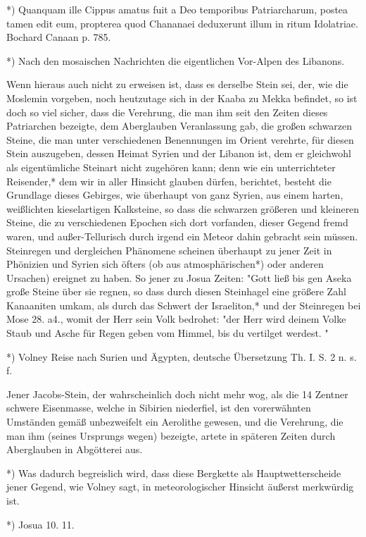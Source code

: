 \documentclass[a4paper, 11pt, oneside, polutonikogreek, german]{article}
\begin{document}
*) Quanquam ille Cippus amatus fuit a Deo temporibus Patriarcharum, postea tamen edit eum, propterea quod Chananaei deduxerunt illum in ritum Idolatriae. Bochard Canaan p. 785.

*) Nach den mosaischen Nachrichten die eigentlichen Vor-Alpen des Libanons.

Wenn hieraus auch nicht zu erweisen ist, dass es derselbe Stein sei, der, wie die Moslemin vorgeben, noch heutzutage sich in der Kaaba zu Mekka befindet, so ist doch so viel sicher, dass die Verehrung, die man ihm seit den Zeiten dieses Patriarchen bezeigte, dem Aberglauben Veranlassung gab, die großen schwarzen Steine, die man unter verschiedenen Benennungen im Orient verehrte, für diesen Stein auszugeben, dessen Heimat Syrien und der Libanon ist, dem er gleichwohl als eigentümliche Steinart nicht zugehören kann; denn wie ein unterrichteter Reisender,* dem wir in aller Hinsicht glauben dürfen, berichtet, besteht die Grundlage dieses Gebirges, wie überhaupt von ganz Syrien, aus einem harten, weißlichten kieselartigen Kalksteine, so dass die schwarzen größeren und kleineren Steine, die zu verschiedenen Epochen sich dort vorfanden, dieser Gegend fremd waren, und außer-Tellurisch durch irgend ein Meteor dahin gebracht sein müssen. Steinregen und dergleichen Phänomene scheinen überhaupt zu jener Zeit in Phönizien und Syrien sich öfters (ob aus atmosphärischen*) oder anderen Ursachen) ereignet zu haben. So jener zu Josua Zeiten: "Gott ließ bis gen Aseka große Steine über sie regnen, so dass durch diesen Steinhagel eine größere Zahl Kanaaniten umkam, als durch das Schwert der Israeliton,* und der Steinregen bei Mose 28. a4., womit der Herr sein Volk bedrohet: "der Herr wird deinem Volke Staub und Asche für Regen geben vom Himmel, bis du vertilget werdest. "

*) Volney Reise nach Surien und Ägypten, deutsche Übersetzung Th. I. S. 2 n. s. f.

Jener Jacobs-Stein, der wahrscheinlich doch nicht mehr wog, als die 14 Zentner schwere Eisenmasse, welche in Sibirien niederfiel, ist den vorerwähnten Umständen gemäß unbezweifelt ein Aerolithe gewesen, und die Verehrung, die man ihm (seines Ursprungs wegen) bezeigte, artete in späteren Zeiten durch Aberglauben in Abgötterei aus.

*) Was dadurch begreislich wird, dass diese Bergkette als Hauptwetterscheide jener Gegend, wie Volney sagt, in meteorologischer Hinsicht äußerst merkwürdig ist.

*) Josua 10. 11.
\end{document}
